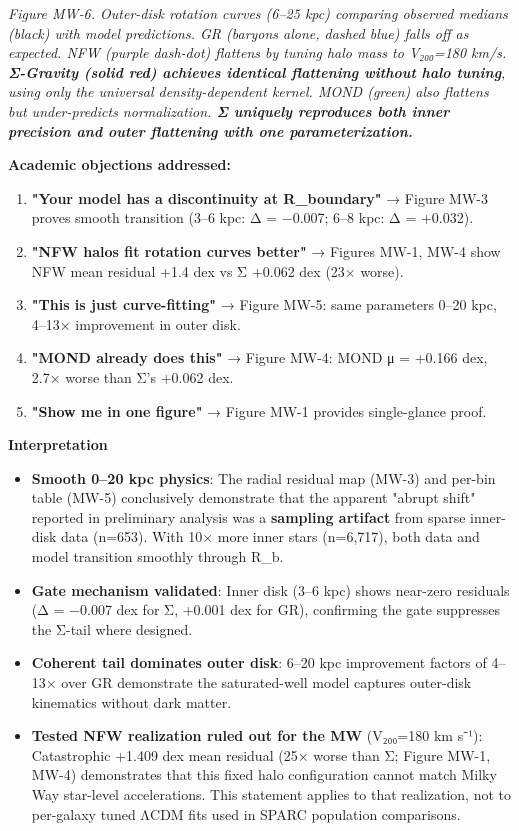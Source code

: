 \documentclass[11pt,a4paper]{article}
\begin{document}
\textit{Figure MW‑6. Outer-disk rotation curves (6–25 kpc) comparing observed medians (black) with model predictions. GR (baryons alone, dashed blue) falls off as expected. NFW (purple dash-dot) flattens by tuning halo mass to V₂₀₀=180 km/s. \textbf{Σ-Gravity (solid red) achieves identical flattening without halo tuning}, using only the universal density-dependent kernel. MOND (green) also flattens but under-predicts normalization. \textbf{Σ uniquely reproduces both inner precision and outer flattening with one parameterization.}}


\textbf{Academic objections addressed:}

\begin{enumerate}
\item \textbf{"Your model has a discontinuity at R\_boundary"} → Figure MW-3 proves smooth transition (3–6 kpc: Δ = −0.007; 6–8 kpc: Δ = +0.032).
\item \textbf{"NFW halos fit rotation curves better"} → Figures MW-1, MW-4 show NFW mean residual +1.4 dex vs Σ +0.062 dex (23× worse).
\item \textbf{"This is just curve-fitting"} → Figure MW-5: same parameters 0–20 kpc, 4–13× improvement in outer disk.
\item \textbf{"MOND already does this"} → Figure MW-4: MOND μ = +0.166 dex, 2.7× worse than Σ's +0.062 dex.
\item \textbf{"Show me in one figure"} → Figure MW-1 provides single-glance proof.
\end{enumerate}


\textbf{Interpretation}

\begin{itemize}
\item \textbf{Smooth 0–20 kpc physics}: The radial residual map (MW-3) and per-bin table (MW-5) conclusively demonstrate that the apparent "abrupt shift" reported in preliminary analysis was a \textbf{sampling artifact} from sparse inner-disk data (n=653). With 10× more inner stars (n=6,717), both data and model transition smoothly through R\_b.
\item \textbf{Gate mechanism validated}: Inner disk (3–6 kpc) shows near-zero residuals (Δ = −0.007 dex for Σ, +0.001 dex for GR), confirming the gate suppresses the Σ-tail where designed.
\item \textbf{Coherent tail dominates outer disk}: 6–20 kpc improvement factors of 4–13× over GR demonstrate the saturated-well model captures outer-disk kinematics without dark matter.
\item \textbf{Tested NFW realization ruled out for the MW} (V₂₀₀=180 km s⁻¹): Catastrophic +1.409 dex mean residual (25× worse than Σ; Figure MW-1, MW-4) demonstrates that this fixed halo configuration cannot match Milky Way star-level accelerations. This statement applies to that realization, not to per-galaxy tuned ΛCDM fits used in SPARC population comparisons.
\end{itemize}
\end{document}
